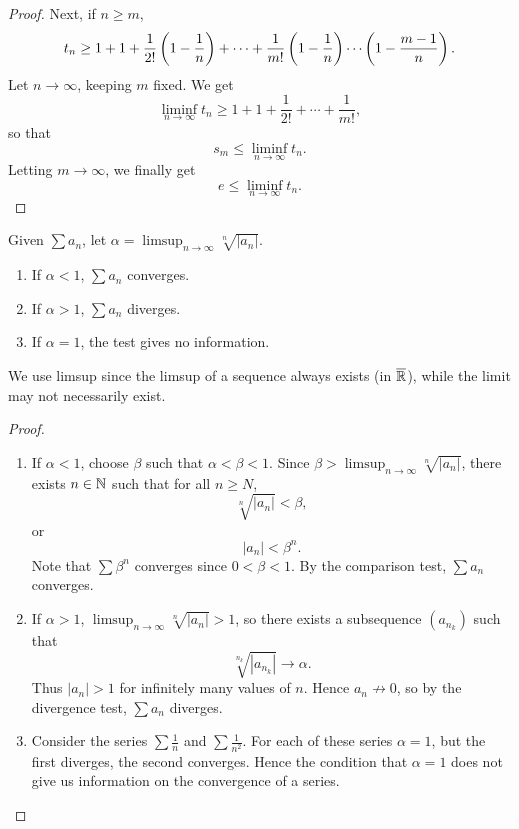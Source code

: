\begin{example}
\begin{proof}
Next, if $n\ge m$,
\[t_n\ge1+1+\frac{1}{2!}\left(1-\frac{1}{n}\right)+\cdots+\frac{1}{m!}\left(1-\frac{1}{n}\right)\cdots\left(1-\frac{m-1}{n}\right).\]
Let $n\to\infty$, keeping $m$ fixed. We get
\[\liminf_{n\to\infty}t_n\ge1+1+\frac{1}{2!}+\cdots+\frac{1}{m!},\]
so that
\[s_m\le\liminf_{n\to\infty}t_n.\]
Letting $m\to\infty$, we finally get
\[e\le\liminf_{n\to\infty}t_n.\]

\end{proof}
\end{example}

\begin{lemma}\label{lemma:root-test}
Given $\sum a_n$, let $\displaystyle\alpha=\limsup_{n\to\infty}\sqrt[n]{|a_n|}$.
\begin{enumerate}[label=(\roman*)]
\item If $\alpha<1$, $\sum a_n$ converges.
\item If $\alpha>1$, $\sum a_n$ diverges.
\item If $\alpha=1$, the test gives no information.
\end{enumerate}
\end{lemma}

\begin{remark}
We use limsup since the limsup of a sequence always exists (in $\overline{\mathbb R}$), while the limit may not necessarily exist.
\end{remark}

\begin{proof} \
\begin{enumerate}[label=(\roman*)]
\item If $\alpha<1$, choose $\beta$ such that $\alpha<\beta<1$. Since $\displaystyle\beta>\limsup_{n\to\infty}\sqrt[n]{|a_n|}$, there exists $n\in\mathbb N$ such that for all $n\ge N$,
\[\sqrt[n]{|a_n|}<\beta,\]
or
\[|a_n|<\beta^n.\]
Note that $\sum\beta^n$ converges since $0<\beta<1$. By the comparison test, $\sum a_n$ converges.

\item If $\alpha>1$, $\displaystyle\limsup_{n\to\infty}\sqrt[n]{|a_n|}>1$, so there exists a subsequence $(a_{n_k})$ such that
\[\sqrt[n_k]{|a_{n_k}|}\to\alpha.\]
Thus $|a_n|>1$ for infinitely many values of $n$. Hence $a_n\not\to0$, so by the divergence test, $\sum a_n$ diverges.

\item Consider the series $\sum\frac{1}{n}$ and $\sum\frac{1}{n^2}$. For each of these series $\alpha=1$, but the first diverges, the second converges. Hence the condition that $\alpha=1$ does not give us information on the convergence of a series.
\end{enumerate}
\end{proof}

